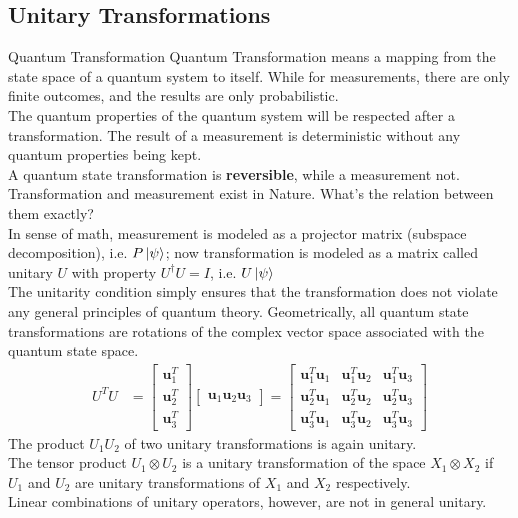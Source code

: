 \documentclass{beamer}
\begin{document}
\subsection{Unitary Transformations}
\begin{frame}{Quantum Transformation}
  {\tiny
    Quantum Transformation means a mapping from the state space of a quantum system to itself.
    While for measurements, there are only finite outcomes, and the results are only probabilistic.\\
    The quantum properties of the quantum system will be respected after a transformation.
    The result of a measurement is deterministic without any quantum properties being kept.\\
    A quantum state transformation is \textbf{reversible}, while a measurement not.\\
    Transformation and measurement exist in Nature. What's the relation between them exactly?\\
    \vspace{0.3cm}
    In sense of math, measurement is modeled as a projector matrix (subspace decomposition), i.e. $P\ket{\psi}$;
    now transformation is modeled as a matrix called unitary $U$ with property $U^{\dagger}U = I$, i.e. $U\ket{\psi}$\\
    The unitarity condition simply ensures that the transformation does not violate any general principles of quantum theory.
    Geometrically, all quantum state transformations are rotations of the complex vector space associated with the quantum state space.
    \begin{align*}
      U^TU &=
        \begin{bmatrix}
          \mathbf{u}_1^T \\
          \mathbf{u}_2^T \\
          \mathbf{u}_3^T
        \end{bmatrix}
        \begin{bmatrix} \mathbf{u}_1 \mathbf{u}_2 \mathbf{u}_3 \end{bmatrix} 
        = 
        \begin{bmatrix}
          \mathbf{u}_1^T \mathbf{u}_1 & \mathbf{u}_1^T \mathbf{u}_2 & \mathbf{u}_1^T \mathbf{u}_3 \\
          \mathbf{u}_2^T \mathbf{u}_1 & \mathbf{u}_2^T \mathbf{u}_2 & \mathbf{u}_2^T \mathbf{u}_3 \\
          \mathbf{u}_3^T \mathbf{u}_1 & \mathbf{u}_3^T \mathbf{u}_2 & \mathbf{u}_3^T \mathbf{u}_3
        \end{bmatrix}
    \end{align*}
    \vspace{0.3cm}
    The product $U_1 U_2$ of two unitary transformations is again unitary. \\
    The tensor product $U_1 \otimes U_2$ is a unitary transformation of the space $X_1 \otimes X_2$ if $U_1$ and $U_2$ are unitary transformations of $X_1$ and $X_2$ respectively.\\
    Linear combinations of unitary operators, however, are not in general unitary.
  }%
\end{frame}
\end{document}

